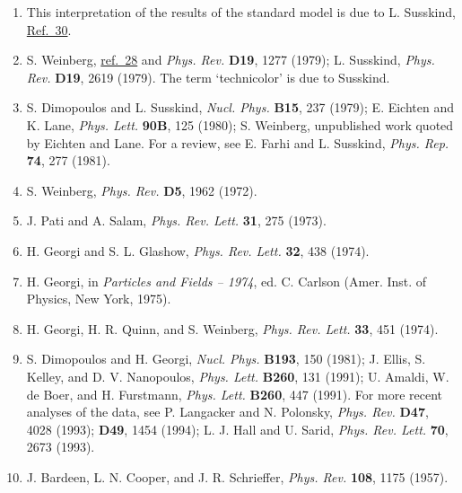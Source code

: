 \begin{enumerate}
\item {}\label{ch21-ref-29}
This interpretation of the results of the standard model is due to
L. Susskind, \hyperref[ch21-ref-30]{Ref.~30}.

\item {}\label{ch21-ref-30}
S. Weinberg, \hyperref[ch21-ref-28]{ref.~28} and \emph{Phys. Rev.}
\textbf{D19}, 1277 (1979); L. Susskind, \emph{Phys. Rev.} \textbf{D19},
2619 (1979). The term `technicolor' is due to Susskind.

\item {}\label{ch21-ref-31}
S. Dimopoulos and L. Susskind, \emph{Nucl. Phys.} \textbf{B15}, 237
(1979); E. Eichten and K. Lane, \emph{Phys. Lett.} \textbf{90B}, 125
(1980); S. Weinberg, unpublished work quoted by Eichten and Lane. For a
review, see E. Farhi and L. Susskind, \emph{Phys. Rep.} \textbf{74}, 277
(1981).

\item {}\label{ch21-ref-32}
S. Weinberg, \emph{Phys. Rev.} \textbf{D5}, 1962 (1972).

\item {}\label{ch21-ref-33}
J. Pati and A. Salam, \emph{Phys. Rev. Lett.} \textbf{31}, 275 (1973).

\item {}\label{ch21-ref-34}
H. Georgi and S. L. Glashow, \emph{Phys. Rev. Lett.} \textbf{32}, 438
(1974).

\item {}\label{ch21-ref-35}
H. Georgi, in \emph{Particles and Fields -- 1974}, ed. C. Carlson
(Amer. Inst. of Physics, New York, 1975).

\item {}\label{ch21-ref-36}
H. Georgi, H. R. Quinn, and S. Weinberg, \emph{Phys. Rev. Lett.}
\textbf{33}, 451 (1974).

\item[36a.] \label{ch21-ref-36a}
S. Dimopoulos and H. Georgi, \emph{Nucl. Phys.} \textbf{B193}, 150
(1981); J. Ellis, S. Kelley, and D. V. Nanopoulos, \emph{Phys. Lett.}
\textbf{B260}, 131 (1991); U. Amaldi, W. de Boer, and H. Furstmann,
\emph{Phys. Lett.} \textbf{B260}, 447 (1991). For more recent analyses of
the data, see P. Langacker and N. Polonsky, \emph{Phys. Rev.} \textbf{D47},
4028 (1993); \textbf{D49}, 1454 (1994); L. J. Hall and U. Sarid,
\emph{Phys. Rev. Lett.} \textbf{70}, 2673 (1993).

\item {}\label{ch21-ref-37}
J. Bardeen, L. N. Cooper, and J. R. Schrieffer, \emph{Phys. Rev.}
\textbf{108}, 1175 (1957).


\end{enumerate}
